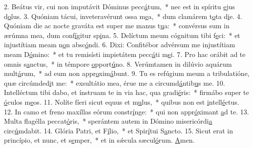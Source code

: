 2. Beátus vir, cui non imputávit Dóminus pecc\uline{á}tum,~* nec est in spíritu \uline{e}jus d\uline{o}lus.
3. Quóniam tácui, inveteravérunt ossa m\uline{e}a,~* dum clamárem t\uline{o}ta d\uline{i}e.
4. Quóniam die ac nocte graváta est super me manus t\uline{u}a:~* convérsus sum in ærúmna mea, dum conf\uline{í}gitur sp\uline{i}na.
5. Delíctum meum cógnitum tibi f\uline{e}ci:~* et injustítiam meam n\uline{o}n absc\uline{ó}ndi.
6. Dixi: Confitébor advérsum me injustítiam meam D\uline{ó}mino:~* et tu remisísti impietátem pecc\uline{á}ti m\uline{e}i.
7. Pro hac orábit ad te omnis s\uline{a}nctus,~* in témpore \uline{o}pport\uline{ú}no.
8. Verúmtamen in dilúvio aquárum mult\uline{á}rum,~* ad eum non appr\uline{o}xim\uline{á}bunt.
9. Tu es refúgium meum a tribulatióne, quæ circúmded\uline{i}t me:~* exsultátio mea, érue me a circumd\uline{á}ntib\uline{u}s me.
10. Intelléctum tibi dabo, et ínstruam te in via hac, qua gradi\uline{é}ris:~* firmábo super te \uline{ó}culos m\uline{e}os.
11. Nolíte fíeri sicut equus et m\uline{u}lus,~* quibus non est \uline{i}ntell\uline{é}ctus.
12. In camo et freno maxíllas eórum constr\uline{í}nge:~* qui non appr\uline{ó}ximant \uline{a}d te.
13. Multa flagélla peccat\uline{ó}ris,~* sperántem autem in Dómino misericórdi\uline{a} circ\uline{ú}mdabit.
14. Glória Patri, et F\uline{í}lio,~* et Spir\uline{í}tui S\uline{a}ncto.
15. Sicut erat in princípio, et nunc, et s\uline{e}mper,~* et in sǽcula sæcul\uline{ó}rum. \uline{A}men.
